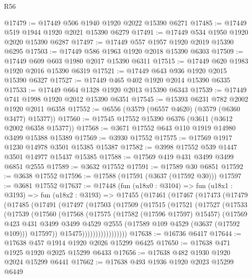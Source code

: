 \begin{lexlean}{R56}
\begin{coremodule}
@17479 := @17449 @506 @1940 @1920 @2022 @15390 @6271
@17485 := @17449 @519 @1944 @1920 @2021 @15390 @6279
@17491 := @17449 @534 @1950 @1920 @2020 @15390 @6287
@17497 := @17449 @557 @1957 @1920 @2019 @15390 @6295
@17503 := @17449 @586 @1963 @1920 @2018 @15390 @6303
@17509 := @17449 @609 @603 @1980 @2017 @15390 @6311
@17515 := @17449 @620 @1983 @1920 @2016 @15390 @6319
@17521 := @17449 @643 @936 @1920 @2015 @15390 @6327
@17527 := @17449 @465 @402 @1920 @2014 @15390 @6335
@17533 := @17449 @664 @1328 @1920 @2013 @15390 @6343
@17539 := @17449 @741 @1998 @1920 @2012 @15390 @6351
@17545 := @15393 @6231 @782 @2002 @1920 @2011 @6358
@17552 := @6556 (@3579 (@6557 @4620) (@3579 (@6360 @3477) @15377))
@17560 := @17545 @17552 @15390 @6376 (@3611 (@3612 @2002 @6358 @15377))
@17568 := @3671 @17552 @643 @110 @1919 @14980 @3499 @15388 @15389
@17569 := @3930 @17552
@17575 := @17569 @1917 @1230 @14978 @3501 @15385 @15387
@17582 := @3998 @17552 @539 @1447 @3501 @14977 @15437 @15385
@17588 := @17569 @419 @431 @3499 @3499 @6851 @2555
@17589 := @3632 @17552
@17591 := @17589 @30 @6851
@17592 := @3638 @17552
@17596 := @17588 (@17591 (@3637 (@17592 @30)))
@17597 := @3681 @17552
@17637 := @17448
    (fun (u18x0 : @3104) =>
    fun (u18x1 : @3193) =>
    fun (u18x2 : @3193) =>
    @17455
      (@17461
        (@17467
          (@17473
            (@17479
              (@17485
                (@17491
                  (@17497
                    (@17503
                      (@17509
                        (@17515
                          (@17521
                            (@17527
                              (@17533
                                (@17539
                                  (@17560
                                    (@17568
                                      (@17575
                                        (@17582 (@17596 @17597) @15457)
                                        (@17569
                                          @423
                                          @431
                                          @3499
                                          @3499
                                          @4529
                                          @2555
                                          (@17589 @109 @4529 (@3637 (@17592 @109)))
                                          @17597))
                                      @15475)))))))))))))))))
@17638 := @16736 @6417
@17644 := @17638 @457 @1914 @1920 @2026 @15299 @6425
@17650 := @17638 @471 @1925 @1920 @2025 @15299 @6433
@17656 := @17638 @482 @1930 @1920 @2024 @15299 @6441
@17662 := @17638 @493 @1936 @1920 @2023 @15299 @6449

\end{coremodule}
\end{lexlean}
